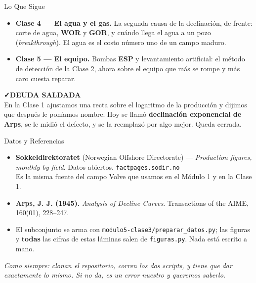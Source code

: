 \documentclass[aspectratio=169, 11pt]{beamer}
\begin{document}
\begin{frame}[shrink=8]{Lo Que Sigue}
  \vspace{4pt}
  {\footnotesize\color{textMuted}
  \begin{itemize}\setlength{\itemsep}{9pt}
    \item[{\color{arcaRed}\faArrowCircleRight}]
      \textbf{Clase 4 --- El agua y el gas.} La segunda causa de la
      declinación, de frente: corte de agua, \textbf{WOR} y \textbf{GOR}, y
      cuándo llega el agua a un pozo (\emph{breakthrough}). El agua es el
      costo número uno de un campo maduro.
    \item[{\color{arcaRed}\faArrowCircleRight}]
      \textbf{Clase 5 --- El equipo.} Bombas \textbf{ESP} y levantamiento
      artificial: el método de detección de la Clase 2, ahora sobre el equipo
      que más se rompe y más caro cuesta reparar.
  \end{itemize}}
  \vspace{9pt}
  \begin{tcolorbox}[colback=arcaGray, colframe=codeGreen, boxrule=0pt, leftrule=3pt,
    arc=3pt, left=8pt, right=8pt, top=5pt, bottom=5pt]
    {\scriptsize\color{codeGreen}\bfseries\faCheck\hspace{4pt}DEUDA SALDADA}\\[4pt]
    {\scriptsize\color{textMuted}
     En la Clase 1 ajustamos una recta sobre el logaritmo de la producción y
     dijimos que después le poníamos nombre. Hoy se llamó
     \textbf{declinación exponencial de Arps}, se le midió el defecto, y se
     la reemplazó por algo mejor. Queda cerrada.}
  \end{tcolorbox}
\end{frame}

\begin{frame}[shrink=10]{Datos y Referencias}
  \vspace{4pt}
  {\footnotesize\color{textMuted}
  \begin{itemize}\setlength{\itemsep}{6pt}
    \item[{\color{arcaRed}\scriptsize\faDatabase}]
      \textbf{Sokkeldirektoratet} (Norwegian Offshore Directorate) ---
      \emph{Production figures, monthly by field}. Datos abiertos.
      \texttt{factpages.sodir.no}\\
      Es la misma fuente del campo Volve que usamos en el Módulo 1 y en la
      Clase 1.
    \item[{\color{arcaRed}\scriptsize\faBook}]
      \textbf{Arps, J. J. (1945).} \textit{Analysis of Decline Curves}.
      Transactions of the AIME, 160(01), 228--247.
    \item[{\color{arcaRed}\scriptsize\faFileCode}]
      El subconjunto se arma con \texttt{modulo5-clase3/preparar\_datos.py};
      las figuras y \textbf{todas} las cifras de estas láminas salen de
      \texttt{figuras.py}. Nada está escrito a mano.
  \end{itemize}}
  \vspace{8pt}
  {\scriptsize\color{arcaDark}\itshape
   Como siempre: clonan el repositorio, corren los dos scripts, y tiene que
   dar exactamente lo mismo. Si no da, es un error nuestro y queremos saberlo.}
\end{frame}
\end{document}
